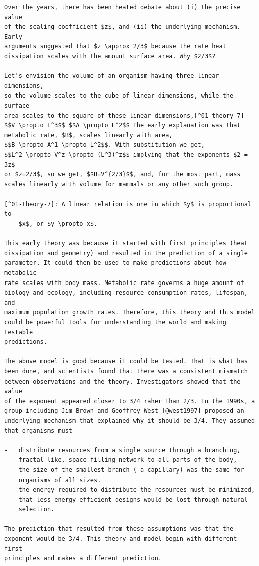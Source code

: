 \documentclass[
  10pt,
  letterpaper,
  nols]{tufte-book}
\begin{document}
\begin{verbatim}
Over the years, there has been heated debate about (i) the precise value
of the scaling coefficient $z$, and (ii) the underlying mechanism. Early
arguments suggested that $z \approx 2/3$ because the rate heat
dissipation scales with the amount surface area. Why $2/3$?

Let's envision the volume of an organism having three linear dimensions,
so the volume scales to the cube of linear dimensions, while the surface
area scales to the square of these linear dimensions,[^01-theory-7]
$$V \propto L^3$$ $$A \propto L^2$$ The early explanation was that
metabolic rate, $B$, scales linearly with area,
$$B \propto A^1 \propto L^2$$. With substitution we get,
$$L^2 \propto V^z \propto (L^3)^z$$ implying that the exponents $2 = 3z$
or $z=2/3$, so we get, $$B=V^{2/3}$$, and, for the most part, mass
scales linearly with volume for mammals or any other such group.

[^01-theory-7]: A linear relation is one in which $y$ is proportional to
    $x$, or $y \propto x$.

This early theory was because it started with first principles (heat
dissipation and geometry) and resulted in the prediction of a single
parameter. It could then be used to make predictions about how metabolic
rate scales with body mass. Metabolic rate governs a huge amount of
biology and ecology, including resource consumption rates, lifespan, and
maximum population growth rates. Therefore, this theory and this model
could be powerful tools for understanding the world and making testable
predictions.

The above model is good because it could be tested. That is what has
been done, and scientists found that there was a consistent mismatch
between observations and the theory. Investigators showed that the value
of the exponent appeared closer to 3/4 raher than 2/3. In the 1990s, a
group including Jim Brown and Geoffrey West [@west1997] proposed an
underlying mechanism that explained why it should be 3/4. They assumed
that organisms must

-   distribute resources from a single source through a branching,
    fractal-like, space-filling network to all parts of the body,
-   the size of the smallest branch ( a capillary) was the same for
    organisms of all sizes.
-   the energy required to distribute the resources must be minimized,
    that less energy-efficient designs would be lost through natural
    selection.

The prediction that resulted from these assumptions was that the
exponent would be 3/4. This theory and model begin with different first
principles and makes a different prediction.


\end{verbatim}
\end{document}
